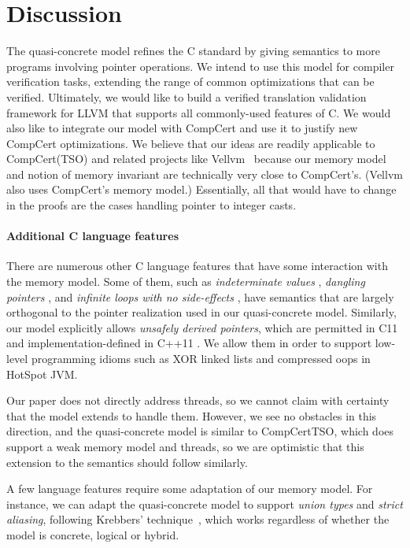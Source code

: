 \section{Discussion}
\label{sec:intptrcast:discussion}

The quasi-concrete model refines the C standard by giving semantics to more programs involving pointer operations. We intend to use this model for compiler verification tasks, extending the range of common optimizations that can be verified. Ultimately, we would like to build a verified translation validation framework for LLVM that supports all commonly-used features of C. We would also like to integrate our model with CompCert and use it to justify new CompCert optimizations.
We believe that our ideas are readily applicable to CompCert(TSO) and
related projects like Vellvm~\cite{vellvm:popl12,vellvm:pldi13} because our memory model and notion of
memory invariant are technically very close to CompCert's. (Vellvm
also uses CompCert's memory model.) Essentially, all that would have
to change in the proofs are the cases handling pointer to integer
casts.

\paragraph{Additional C language features}

There are numerous other C language features that have some
interaction with the memory model.  Some of them, such as
\textit{indeterminate values} \cite[\S3.19.2p1]{iso2011iec}, \textit{dangling pointers}
\cite[\S6.2.4p2]{iso2011iec}, and \textit{infinite loops with no side-effects}
\cite[\S6.8.5p6]{iso2011iec}, have semantics that are largely orthogonal to
the pointer realization used in our quasi-concrete model.
Similarly, our model explicitly allows \textit{unsafely derived pointers},
which are permitted in C11 and implementation-defined in C++11 \cite[\S3.7.4p4]{iso2011iec}. We allow them in order to support low-level
programming idioms such as XOR linked lists and compressed oops in
HotSpot JVM.

Our paper does not directly address threads, so we cannot claim with
certainty that the model extends to handle them.  However, we see no
obstacles in this direction, and the quasi-concrete model is similar
to CompCertTSO, which does support a weak memory model and threads, so
we are optimistic that this extension to the semantics should follow similarly.

A few language features require some adaptation of our memory model.
For instance, we can adapt the quasi-concrete model to support
\textit{union types} and \textit{strict aliasing}, following Krebbers'
technique~\cite{krebbers2013aliasing}, which works regardless of
whether the model is concrete, logical or hybrid.


